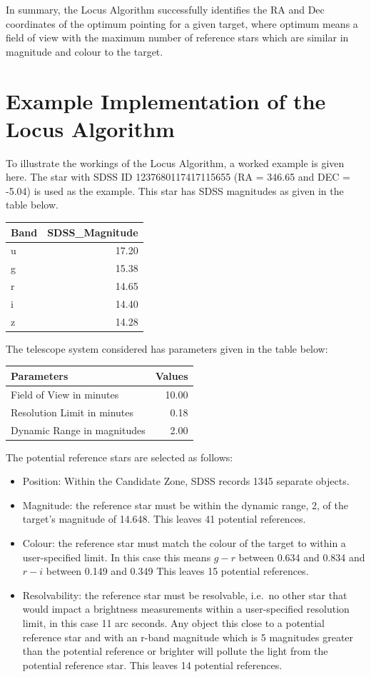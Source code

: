 \documentclass[]{elsarticle} %
\providecommand{\tightlist}{%
  \setlength{\itemsep}{0pt}\setlength{\parskip}{0pt}}
\begin{document}
In summary, the Locus Algorithm successfully identifies the RA and Dec
coordinates of the optimum pointing for a given target, where optimum
means a field of view with the maximum number of reference stars which
are similar in magnitude and colour to the target.


\hypertarget{example-implementation-of-the-locus-algorithm}{%
\section{Example Implementation of the Locus
Algorithm}\label{example-implementation-of-the-locus-algorithm}}

To illustrate the workings of the Locus Algorithm, a worked example is
given here. The star with SDSS ID 1237680117417115655 (RA = 346.65 and
DEC = -5.04) is used as the example. This star has SDSS magnitudes as
given in the table below.

\begin{longtable}[]{@{}lr@{}}
\toprule
Band & SDSS\_Magnitude\tabularnewline
\midrule
\endhead
u & 17.20\tabularnewline
g & 15.38\tabularnewline
r & 14.65\tabularnewline
i & 14.40\tabularnewline
z & 14.28\tabularnewline
\bottomrule
\end{longtable}

The telescope system considered has parameters given in the table below:

\begin{longtable}[]{@{}lr@{}}
\toprule
Parameters & Values\tabularnewline
\midrule
\endhead
Field of View in minutes & 10.00\tabularnewline
Resolution Limit in minutes & 0.18\tabularnewline
Dynamic Range in magnitudes & 2.00\tabularnewline
\bottomrule
\end{longtable}

The potential reference stars are selected as follows:

\begin{itemize}
\tightlist
\item
  Position: Within the Candidate Zone, SDSS records 1345 separate
  objects.
\item
  Magnitude: the reference star must be within the dynamic range, 2, of
  the target's magnitude of 14.648. This leaves 41 potential references.
\item
  Colour: the reference star must match the colour of the target to
  within a user-specified limit. In this case this means \(g - r\)
  between 0.634 and 0.834 and \(r - i\) between 0.149 and 0.349 This
  leaves 15 potential references.
\item
  Resolvability: the reference star must be resolvable, i.e.~no other
  star that would impact a brightness measurements within a
  user-specified resolution limit, in this case 11 arc seconds. Any
  object this close to a potential reference star and with an r-band
  magnitude which is 5 magnitudes greater than the potential reference
  or brighter will pollute the light from the potential reference star.
  This leaves 14 potential references.
\end{itemize}
\end{document}
